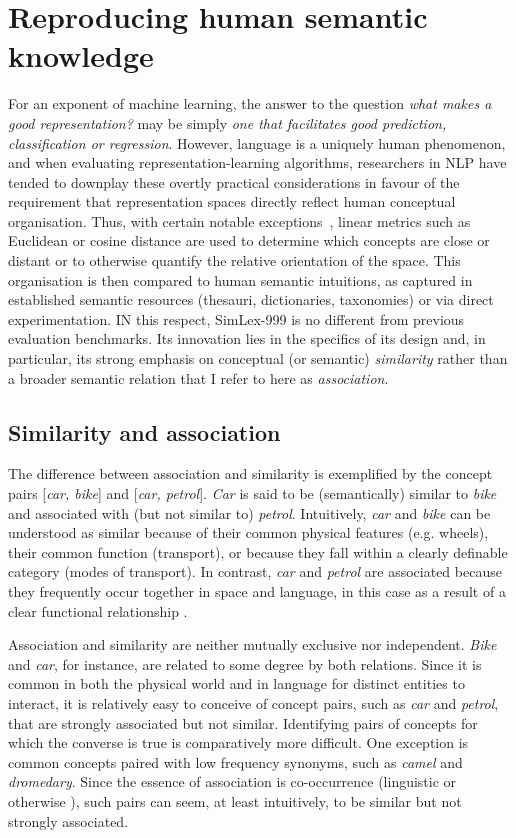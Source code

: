\section{Reproducing human semantic knowledge}

For an exponent of machine learning, the answer to the question \emph{what makes a good representation?} may be simply \emph{one that facilitates good prediction, classification or regression}. However, language is a uniquely human phenomenon, and when evaluating  representation-learning algorithms, researchers in NLP have tended to downplay these overtly practical considerations in favour of the requirement that representation spaces directly reflect human conceptual organisation. Thus, with certain notable exceptions~\citep{collobert2008unified,turian2010word}, linear metrics such as Euclidean or cosine distance are used to determine which concepts are close or distant or to otherwise quantify the relative orientation of the space. This organisation is then compared to human semantic intuitions, as captured in established semantic resources (thesauri, dictionaries, taxonomies) or via direct experimentation. IN this respect, SimLex-999 is no different from previous evaluation benchmarks. Its innovation lies in the specifics of its design and, in particular, its strong emphasis on conceptual (or semantic) \emph{similarity} rather than a broader semantic relation that I refer to here as \emph{association}.  

\subsection{Similarity and association} 

The difference between association and similarity is exemplified by the concept pairs [\emph{car, bike}] and [\emph{car, petrol}]. \emph{Car} is said to be (semantically) similar to \emph{bike} and associated with (but not similar to) \emph{petrol}. Intuitively, \emph{car} and \emph{bike} can be understood as similar because of their common physical features (e.g. wheels), their common function (transport), or because they fall within a clearly definable category (modes of transport). In contrast, \emph{car} and \emph{petrol} are associated because they frequently occur together in space and language, in this case as a result of a clear functional relationship \citep{plaut1995semantic,mcrae2012semantic}. 

Association and similarity are neither mutually exclusive nor independent. \emph{Bike} and \emph{car}, for instance, are related to some degree by both relations. Since it is common in both the physical world and in language for distinct entities to interact, it is relatively easy to conceive of concept pairs, such as \emph{car} and \emph{petrol}, that are strongly associated but not similar. Identifying pairs of concepts for which the converse is true is comparatively more difficult. One exception is common concepts paired with low frequency synonyms, such as \emph{camel} and \emph{dromedary}. Since the essence of association is co-occurrence (linguistic or otherwise \citep{mcrae2012semantic}), such pairs can seem, at least intuitively, to be similar but not strongly associated.  

